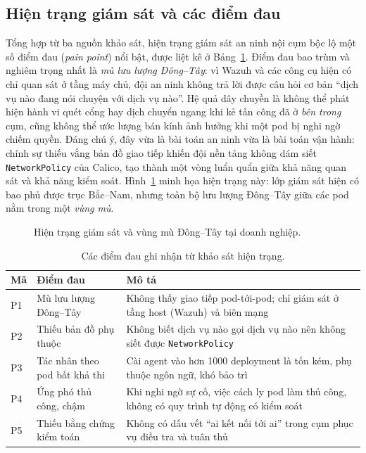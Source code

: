 \subsection{Hiện trạng giám sát và các điểm đau}
\label{subsec:pain-points}

Tổng hợp từ ba nguồn khảo sát, hiện trạng giám sát an ninh nội cụm bộc lộ một số điểm đau
(\textit{pain point}) nổi bật, được liệt kê ở Bảng~\ref{tab:pain-points}. Điểm đau bao
trùm và nghiêm trọng nhất là \emph{mù lưu lượng Đông--Tây}: vì Wazuh và các công cụ hiện
có chỉ quan sát ở tầng máy chủ, đội an ninh không trả lời được câu hỏi cơ bản ``dịch vụ
nào đang nói chuyện với dịch vụ nào''. Hệ quả dây chuyền là không thể phát hiện hành vi
quét cổng hay dịch chuyển ngang khi kẻ tấn công đã ở \emph{bên trong} cụm, cũng không thể
ước lượng bán kính ảnh hưởng khi một pod bị nghi ngờ chiếm quyền. Đáng chú ý, đây vừa là
bài toán an ninh vừa là bài toán vận hành: chính sự thiếu vắng bản đồ giao tiếp khiến đội
nền tảng không dám siết \texttt{NetworkPolicy} của Calico, tạo thành một vòng luẩn quẩn
giữa khả năng quan sát và khả năng kiểm soát. Hình~\ref{fig:current-gap} minh họa hiện
trạng này: lớp giám sát hiện có bao phủ được trục Bắc--Nam, nhưng toàn bộ lưu lượng
Đông--Tây giữa các pod nằm trong một \emph{vùng mù}.

\begin{figure}[H]
  \centering
  \resizebox{0.82\linewidth}{!}{}
  \caption{Hiện trạng giám sát và vùng mù Đông--Tây tại doanh nghiệp.}
  \label{fig:current-gap}
\end{figure}

\begin{table}[H]
  \centering
  \caption{Các điểm đau ghi nhận từ khảo sát hiện trạng.}
  \label{tab:pain-points}
  \small
  \begin{tabularx}{\linewidth}{@{}l l X@{}}
    \toprule
    \textbf{Mã} & \textbf{Điểm đau} & \textbf{Mô tả} \\
    \midrule
    P1 & Mù lưu lượng Đông--Tây   & Không thấy giao tiếp pod-tới-pod; chỉ giám sát ở tầng host (Wazuh) và biên mạng \\
    P2 & Thiếu bản đồ phụ thuộc   & Không biết dịch vụ nào gọi dịch vụ nào nên không siết được \texttt{NetworkPolicy} \\
    P3 & Tác nhân theo pod bất khả thi & Cài agent vào hơn 1000 deployment là tốn kém, phụ thuộc ngôn ngữ, khó bảo trì \\
    P4 & Ứng phó thủ công, chậm   & Khi nghi ngờ sự cố, việc cách ly pod làm thủ công, không có quy trình tự động có kiểm soát \\
    P5 & Thiếu bằng chứng kiểm toán & Không có dấu vết ``ai kết nối tới ai'' trong cụm phục vụ điều tra và tuân thủ \\
    \bottomrule
  \end{tabularx}
\end{table}


